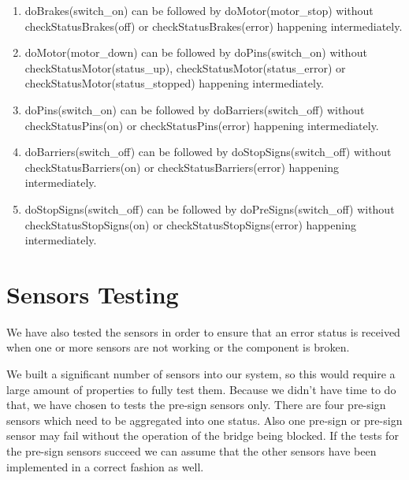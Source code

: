 \begin{enumerate}
    	
    	\item doBrakes(switch\_on) can be followed by doMotor(motor\_stop) without checkStatusBrakes(off) or checkStatusBrakes(error) happening intermediately.
    	
    		
    
    	\item doMotor(motor\_down) can be followed by doPins(switch\_on) without checkStatusMotor(status\_up), checkStatusMotor(status\_error) or checkStatusMotor(status\_stopped) happening intermediately. 
    	
    	
    	
    	\item doPins(switch\_on) can be followed by doBarriers(switch\_off) without checkStatusPins(on) or checkStatusPins(error) happening intermediately. 
    	
    	
    	
    	\item doBarriers(switch\_off) can be followed by doStopSigns(switch\_off) without checkStatusBarriers(on) or checkStatusBarriers(error) happening intermediately.
    	
    		
    	
    	\item doStopSigns(switch\_off) can be followed by doPreSigns(switch\_off) without checkStatusStopSigns(on) or checkStatusStopSigns(error) happening intermediately. 
    	
    	
    	
    \end{enumerate}


	\section{Sensors Testing}
	
	We have also tested the sensors in order to ensure that an error status is received when one or more sensors are not working or the component is broken.  
	
	We built a significant number of sensors into our system, so this would require a large amount of properties to fully test them. 
	Because we didn't have time to do that, we have chosen to tests the pre-sign sensors only.
	There are four pre-sign sensors which need to be aggregated into one status.
	Also one pre-sign or pre-sign sensor may fail without the operation of the bridge being blocked.
	If the tests for the pre-sign sensors succeed we can assume that the other sensors have been implemented in a correct fashion as well.
	

